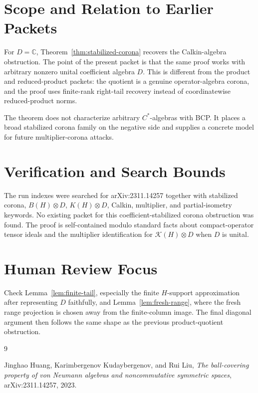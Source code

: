 \documentclass[11pt]{article}
\newcommand{\K}{\mathcal K}
\newcommand{\C}{\mathbb C}
\begin{document}
\section*{Scope and Relation to Earlier Packets}

For \(D=\C\), Theorem~\ref{thm:stabilized-corona} recovers the Calkin-algebra
obstruction.  The point of the present packet is that the same proof works
with arbitrary nonzero unital coefficient algebra \(D\).  This is different
from the product and reduced-product packets: the quotient is a genuine
operator-algebra corona, and the proof uses finite-rank right-tail recovery
instead of coordinatewise reduced-product norms.

The theorem does not characterize arbitrary \(C^*\)-algebras with BCP.  It
places a broad stabilized corona family on the negative side and supplies a
concrete model for future multiplier-corona attacks.

\section*{Verification and Search Bounds}

The run indexes were searched for arXiv:2311.14257 together with stabilized
corona, \(B(H)\otimes D\), \(K(H)\otimes D\), Calkin, multiplier, and
partial-isometry keywords.  No existing packet for this coefficient-stabilized
corona obstruction was found.  The proof is self-contained modulo standard
facts about compact-operator tensor ideals and the multiplier identification
for \(\K(H)\otimes D\) when \(D\) is unital.

\section*{Human Review Focus}

Check Lemma~\ref{lem:finite-tail}, especially the finite \(H\)-support
approximation after representing \(D\) faithfully, and Lemma~\ref{lem:fresh-range},
where the fresh range projection is chosen away from the finite-column image.
The final diagonal argument then follows the same shape as the previous
product-quotient obstruction.

\begin{thebibliography}{9}

Jinghao Huang, Karimbergenov Kudaybergenov, and Rui Liu,
\emph{The ball-covering property of von Neumann algebras and noncommutative
symmetric spaces},
arXiv:2311.14257, 2023.

\end{thebibliography}
\end{document}
